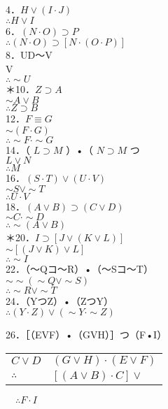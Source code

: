 4．$H \vee(I \cdot J)$\\
$\therefore H \vee I$\\
6．$(N \cdot O) \supset P$\\
$\therefore(N \cdot O) \supset[N \cdot(O \cdot P)]$\\
8．UD～V\\
V\\
$\therefore \sim U$\\
＊10．$Z \supset A$\\
$\sim A \vee B$\\
$\therefore Z \supset B$\\
12．$F \equiv G$\\
$\sim(F \cdot G)$\\
$\therefore \sim F \cdot \sim G$\\
14．（ $L \supset M$ ）•（ $N \supset M$ つ\\
$L \vee N$\\
$\therefore M$\\
16．$(S \cdot T) \vee(U \cdot V)$\\
$\sim S \vee \sim T$\\
$\therefore U \cdot V$\\
18．$(A \vee B) \supset(C \vee D)$\\
$\sim C \cdot \sim D$\\
$\therefore \sim(A \vee B)$\\
＊20．$I \supset[J \vee(K \vee L)]$\\
$\sim[(J \vee K) \vee L]$\\
$\therefore \sim I$\\
22．（～Qコ～R）•（～Sコ～T）\\
$\sim \sim(\sim Q \vee \sim S)$\\
$\therefore \sim R \vee \sim T$\\
24．（YつZ）•（ZつY）\\
$\therefore(Y \cdot Z) \vee(\sim Y \cdot \sim Z)$

26．［（EVF）•（GVH）］つ（F•I）

\begin{center}
\begin{tabular}{ll}
$C \vee D$ & $(G \vee H) \cdot(E \vee F)$ \\
$\therefore$ & $[(A \vee B) \cdot C] \vee$ \\
\end{tabular}
\end{center}$\quad \therefore F \cdot I$

